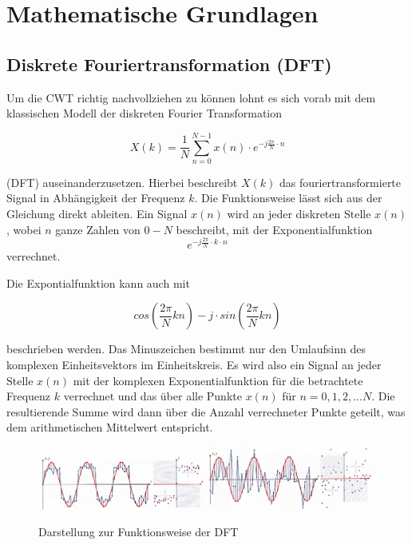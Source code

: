 %
%
%
%
\section{Mathematische Grundlagen
\label{wavelets:section:teil1}}

\subsection{Diskrete Fouriertransformation (DFT)
\label{wavelets:subsection:DFT}}
Um die CWT richtig nachvollziehen zu können lohnt es sich vorab mit dem klassischen Modell der diskreten Fourier Transformation

\begin{equation}
	X(k)=\frac{1}{N}\sum_{n=0}^{N-1}x(n)\cdot e^{-j\frac{2\pi}{N}\cdot n}
	\label{wavelets:equation1}
\end{equation}
 
(DFT) auseinanderzusetzen. Hierbei beschreibt $X(k)$  das fouriertransformierte Signal in Abhängigkeit der Frequenz $k$.
Die Funktionsweise lässt sich aus der Gleichung direkt ableiten.
Ein Signal $x(n)$ wird an jeder diskreten Stelle $x(n)$, wobei $n$ ganze Zahlen von $0-N$ beschreibt, mit der Exponentialfunktion \[e^{-j\frac{2\pi}{N}\cdot k\cdot n}\] verrechnet.

Die Expontialfunktion kann auch mit

\begin{equation}
	cos(\frac{2\pi}{N}kn)-j\cdot sin(\frac{2\pi}{N}kn)
	\label{wavelets:equation2}
\end{equation} 

beschrieben werden. Das Minuszeichen bestimmt nur den Umlaufsinn des komplexen Einheitsvektors im Einheitskreis.
Es wird also ein Signal an jeder Stelle $x(n)$ mit der komplexen Exponentialfunktion für die betrachtete Frequenz $k$ verrechnet und das über alle Punkte $x(n)$ für $n=0,1,2,...N$. Die resultierende Summe wird dann über die Anzahl verrechneter Punkte geteilt, was dem arithmetischen Mittelwert entspricht.

\begin{figure}
	\centering
	\includegraphics[width=0.49\textwidth]{papers/wavelets/images/2_DFT1.png}
	\includegraphics[width=0.49\textwidth]{papers/wavelets/images/2_DFT2.png}
	\caption{Darstellung zur Funktionsweise der DFT}
	\label{wavelet:fig:2_DFT1&2}
\end{figure}

